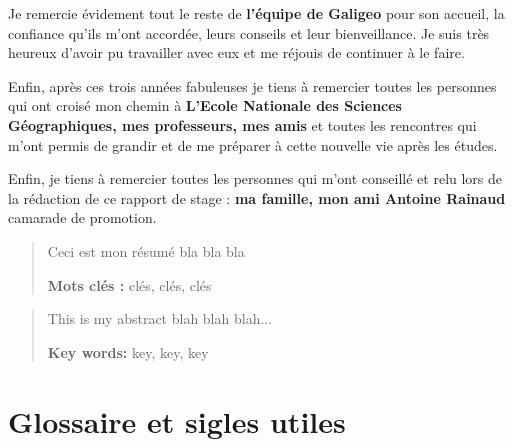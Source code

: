 \documentclass{themeensg}
\begin{document}
Je remercie évidement tout le reste de \textbf{l’équipe de Galigeo} pour son accueil, la confiance qu’ils m’ont accordée, leurs conseils et leur bienveillance. Je suis très heureux d’avoir pu travailler avec eux et me réjouis de continuer à le faire.

Enfin, après ces trois années fabuleuses je tiens à remercier toutes les personnes qui ont croisé mon chemin à \textbf{L’Ecole Nationale des Sciences Géographiques, mes professeurs, mes amis} et toutes les rencontres qui m’ont permis de grandir et de me préparer à cette nouvelle vie après les études.

Enfin, je tiens à remercier toutes les personnes qui m'ont conseillé et relu lors de la rédaction de ce rapport de stage : \textbf{ma famille, mon ami Antoine Rainaud} camarade de promotion.



\begin{abstract}
\thispagestyle{empty}
	\vspace{1cm}

	Ceci est mon résumé bla bla bla
	
	\vspace{1.5cm}
	
	\textbf{Mots clés :} clés, clés, clés
\end{abstract}


\begin{abstract}
\thispagestyle{empty}
	\vspace{1cm}
	
	This is my abstract blah blah blah...
	
	\vspace{1.5cm}
	
	\textbf{Key words:} key, key, key
\end{abstract}


\tableofcontents



\newevenpage
\chapter*{Glossaire et sigles utiles}
\end{document}
